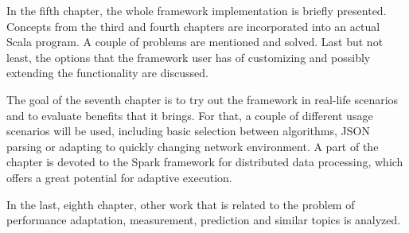 In the fifth chapter, the whole framework implementation is briefly presented. Concepts from the third and fourth chapters are incorporated into an actual Scala program. A couple of problems are mentioned and solved. Last but not least, the options that the framework user has of customizing and possibly extending the functionality are discussed.

The goal of the seventh chapter is to try out the framework in real-life scenarios and to evaluate benefits that it brings. For that, a couple of different usage scenarios will be used, including basic selection between algorithms, JSON parsing or adapting to quickly changing network environment. A part of the chapter is devoted to the Spark framework for distributed data processing, which offers a great potential for adaptive execution.

In the last, eighth chapter, other work that is related to the problem of performance adaptation, measurement, prediction and similar topics is analyzed.